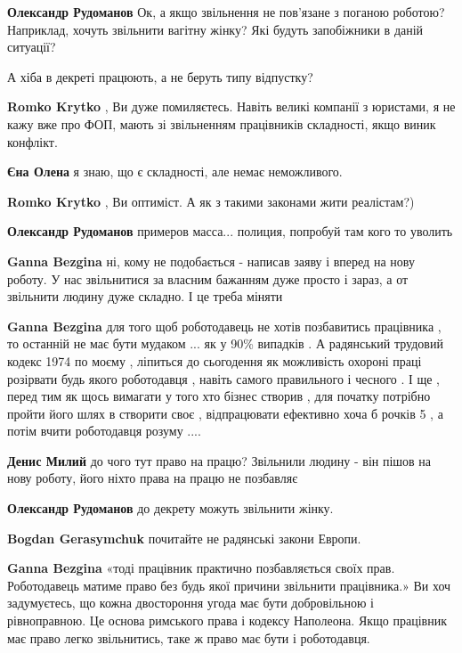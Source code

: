 \begin{itemize}
\begin{itemize}
\textbf{Олександр Рудоманов} Ок, а якщо звільнення не пов'язане з поганою роботою? Наприклад, хочуть звільнити вагітну жінку? Які будуть запобіжники в даній ситуації?


А хіба в декреті працюють, а не беруть типу відпустку?

\textbf{Romko Krytko} , Ви дуже помиляєтесь. Навіть великі компанії з юристами, я не кажу вже про ФОП, мають зі звільненням працівників складності, якщо виник конфлікт.

\textbf{Єна Олена} я знаю, що є складності, але немає неможливого.

\textbf{Romko Krytko} , Ви оптиміст. А як з такими законами жити реалістам?)

\textbf{Олександр Рудоманов} примеров масса... полиция, попробуй там кого то уволить

\textbf{Ganna Bezgina} ні, кому не подобається - написав заяву і вперед на нову роботу. У нас звільнитися за власним бажанням дуже просто і зараз, а от звільнити людину дуже складно. І це треба міняти

\textbf{Ganna Bezgina} для того щоб роботодавець не хотів позбавитись
працівника , то останній не має бути мудаком ... як у 90\% випадків . А радянський
трудовий кодекс 1974 по моєму , ліпиться до сьогодення як можливість охороні
праці розірвати будь якого роботодавця , навіть самого правильного і чесного .
І ще , перед тим як щось вимагати у того хто бізнес створив , для початку
потрібно пройти його шлях в створити своє , відпрацювати ефективно хоча б
рочків 5 , а потім вчити роботодавця розуму ....

\textbf{Денис Милий} до чого тут право на працю? Звільнили людину - він пішов на нову роботу, його ніхто права на працю не позбавляє

\textbf{Олександр Рудоманов} до декрету можуть звільнити жінку.

\textbf{Bogdan Gerasymchuk} почитайте не радянські закони Европи.

\textbf{Ganna Bezgina} «тоді працівник практично позбавляється своїх прав. Роботодавець матиме право без будь якої причини звільнити працівника.»
Ви хоч задумуєтесь, що кожна двостороння угода має бути добровільною і рівноправною. Це основа римського права і кодексу Наполеона. Якщо працівник має право легко звільнитись, таке ж право має бути і роботодавця.


\end{itemize}
\end{itemize}
